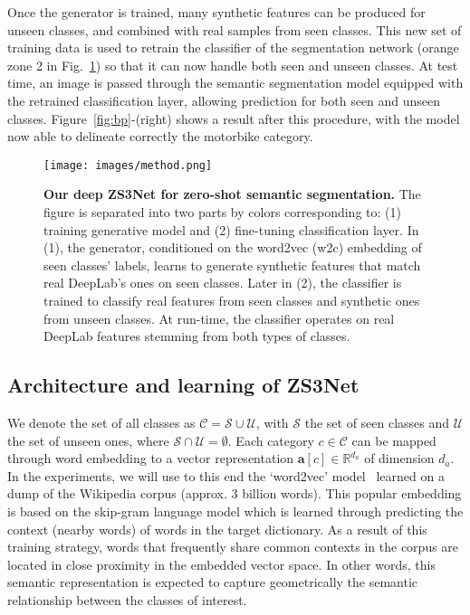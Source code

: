 \documentclass{article}
\newcommand{\mbf}[1]{\ensuremath{\mathbf{#1}}}
\newcommand{\mc}[1]{\ensuremath{\mathcal{#1}}}
\newcommand{\ba}{\mbf{a}}
\newcommand{\cC}{\mc{C}}
\newcommand{\cS}{\mc{S}}
\newcommand{\cU}{\mc{U}}
\begin{document}
Once the generator is trained, many synthetic features can be produced for unseen classes, and combined with real samples from seen classes.
This new set of training data is used to retrain the classifier of the segmentation network (orange zone 2 in Fig.~\ref{method}) so that it can now handle both seen and unseen classes.
At test time, an image is passed through the semantic segmentation model equipped with the retrained classification layer, allowing prediction for both seen and unseen classes. Figure~\ref{fig:bp}-(right) shows a result after this procedure, with the model now able to delineate correctly the motorbike category. 

\begin{figure}[t]
\centering
\texttt{[image: images/method.png]}
\caption{\small \textbf{Our deep ZS3Net for zero-shot semantic segmentation.}
The figure is separated into two parts by colors corresponding to: \textcolor{FIGBLUE}{(1)} training generative model and \textcolor{FIGORANGE}{(2)} fine-tuning classification layer.
In \textcolor{FIGBLUE}{(1)}, the generator, conditioned on the word2vec (\textcolor{FIGGREEN}{w2c}) embedding of seen classes' labels, learns to generate synthetic features that match real DeepLab's ones on seen classes.
Later in \textcolor{FIGORANGE}{(2)}, the classifier is trained to classify real features from seen classes and synthetic ones from unseen classes.
At run-time, the classifier operates on real DeepLab features stemming from both types of classes.}
\vspace{-0.5cm}
\label{method}
\end{figure}

\subsection{Architecture and learning of ZS3Net}\label{sec:arch_design}

We denote the set of all classes as $\cC = \cS \cup \cU$, with $\cS$ the set of seen classes and $\cU$ the set of unseen ones, where $\cS \cap  \cU =  \emptyset$. Each category $c\in\cC$ can be mapped through word embedding to a vector representation $\ba[c]\in\mathbb{R}^{d_a}$ of dimension $d_a$. In the experiments, we will use to this end the `word2vec' model~\cite{mikolov2013distributed} learned on a dump of the Wikipedia corpus (approx. 3 billion words). This popular embedding is based on the skip-gram language model which is learned through predicting the context (nearby words) of words in the target dictionary. As a result of this training strategy, words that frequently share common contexts in the corpus are located in close proximity in the embedded vector space. In other words, this semantic representation is expected to capture geometrically the semantic relationship between the classes of interest.
\end{document}

